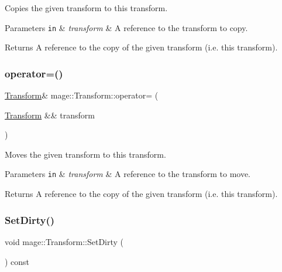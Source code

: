 Copies the given transform to this transform.


\begin{DoxyParams}[1]{Parameters}
\mbox{\tt in}  & {\em transform} & A reference to the transform to copy. \\
\hline
\end{DoxyParams}
\begin{DoxyReturn}{Returns}
A reference to the copy of the given transform (i.\+e. this transform). 
\end{DoxyReturn}
\hypertarget{classmage_1_1_transform_a7ed96cf9bc81595035537139c118efce}{}\label{classmage_1_1_transform_a7ed96cf9bc81595035537139c118efce} 
\subsubsection{\texorpdfstring{operator=()}{operator=()}\hspace{0.1cm}{\footnotesize\ttfamily [2/2]}}
{\footnotesize\ttfamily \hyperlink{classmage_1_1_transform}{Transform}\& mage\+::\+Transform\+::operator= (\begin{DoxyParamCaption}\item[{\hyperlink{classmage_1_1_transform}{Transform} \&\&}]{transform }\end{DoxyParamCaption})\hspace{0.3cm}{\ttfamily [noexcept]}}

Moves the given transform to this transform.


\begin{DoxyParams}[1]{Parameters}
\mbox{\tt in}  & {\em transform} & A reference to the transform to move. \\
\hline
\end{DoxyParams}
\begin{DoxyReturn}{Returns}
A reference to the copy of the given transform (i.\+e. this transform). 
\end{DoxyReturn}
\hypertarget{classmage_1_1_transform_a8d760d79f5ad68377706234b8575e429}{}\label{classmage_1_1_transform_a8d760d79f5ad68377706234b8575e429} 
\subsubsection{\texorpdfstring{Set\+Dirty()}{SetDirty()}}
{\footnotesize\ttfamily void mage\+::\+Transform\+::\+Set\+Dirty (\begin{DoxyParamCaption}{ }\end{DoxyParamCaption}) const\hspace{0.3cm}{\ttfamily [noexcept]}}

